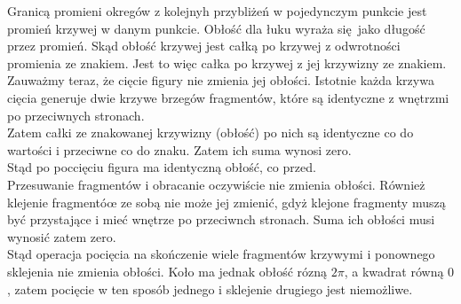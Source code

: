 \documentclass[a4paper, 12pt]{article}
\begin{document}
Granicą promieni okregów z kolejnyh przybliżeń w pojedynczym punkcie jest promień krzywej w danym punkcie.
Obłość dla łuku wyraża się jako długość przez promień. Skąd obłość krzywej jest całką po krzywej z
odwrotności promienia ze znakiem. Jest to więc całka po krzywej z jej krzywizny ze znakiem. \\
Zauważmy teraz, że cięcie figury nie zmienia jej obłości. Istotnie każda krzywa cięcia generuje dwie krzywe
brzegów fragmentów, które są identyczne z wnętrzmi po przeciwnych stronach. \\
Zatem całki ze znakowanej krzywizny (obłość) po nich są identyczne co do wartości i przeciwne co do znaku.
Zatem ich suma wynosi zero. \\
Stąd po poccięciu figura ma identyczną obłość, co przed. \\
Przesuwanie fragmentów i obracanie oczywiście nie zmienia obłości. Również klejenie fragmentóœ ze sobą nie
może jej zmienić, gdyż klejone fragmenty muszą być przystające i mieć wnętrze po przeciwnch stronach. Suma
ich obłości musi wynosić zatem zero. \\
Stąd operacja pocięcia na skończenie wiele fragmentów krzywymi i ponownego sklejenia nie zmienia obłości.
Koło ma jednak obłość rózną $2\pi$, a kwadrat równą $0$, zatem pocięcie w ten sposób jednego i sklejenie
drugiego jest niemożliwe.
\end{document}
